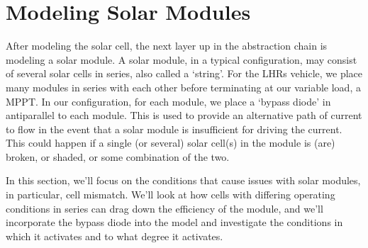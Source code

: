 \section{Modeling Solar Modules}\label{sec:modeling_solar_modules}

After modeling the solar cell, the next layer up in the abstraction chain is
modeling a solar module. A solar module, in a typical configuration, may consist
of several solar cells in series, also called a `string'. For the \ac{LHRs}
vehicle, we place many modules in series with each other before terminating at
our variable load, a \acf{MPPT}. In our configuration, for each module, we place
a `bypass diode' in antiparallel to each module. This is used to provide an
alternative path of current to flow in the event that a solar module is
insufficient for driving the current. This could happen if a single (or several)
solar cell(s) in the module is (are) broken, or shaded, or some combination of
the two.

In this section, we'll focus on the conditions that cause issues with solar
modules, in particular, cell mismatch. We'll look at how cells with differing
operating conditions in series can drag down the efficiency of the module, and
we'll incorporate the bypass diode into the model and investigate the
conditions in which it activates and to what degree it activates.




